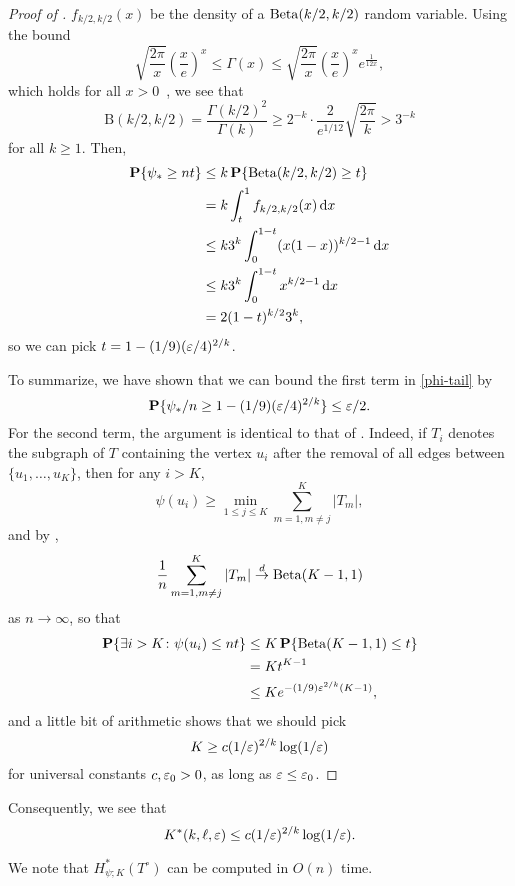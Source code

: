 \begin{proof}[Proof of ]
  $f_{k/2, k/2}(x)$ be the density of a $\operatorname{Beta}(k/2, k/2)$ random
  variable. Using the bound
  \[
    \sqrt{\frac{2 \pi}{x}} \left(\frac{x}{e}\right)^x \le \Gamma(x) \le \sqrt{\frac{2 \pi}{x}} \left(\frac{x}{e} \right)^x e^{\frac{1}{12 x}} ,
  \]
  which holds for all $x > 0$~\cite[Equation 5.6.1]{nist}, we see that
  \[
    \mathrm{B}(k/2, k/2) = \frac{\Gamma(k/2)^2}{\Gamma(k)} \ge 2^{-k} \cdot \frac{2}{e^{1/12}} \sqrt{\frac{2 \pi}{k}} > 3^{-k} 
  \]
  for all $k \ge 1$. Then,
  \begin{align*}
    \operatorname{\mathbf{P}}\{\psi_* \ge nt\} &\le k \operatorname{\mathbf{P}}\{\operatorname{Beta}(k/2, k/2) \ge t\} \\
                                    &= k \int_{t}^1 f_{k/2, k/2}(x) \mathop{}\!\mathrm{d} x \\
                              &\le k 3^k \int_0^{1 - t} (x (1 - x))^{k/2 - 1} \mathop{}\!\mathrm{d} x \\
                              &\le k 3^k \int_0^{1 - t} x^{k/2 - 1} \mathop{}\!\mathrm{d} x \\
                          &= 2 (1 - t)^{k/2} 3^k,
  \end{align*}
  so we can pick $t = 1 - (1/9) (\varepsilon/4)^{2/k}$.

  To summarize, we have shown that we can bound the first term in
  \eqref{phi-tail} by
  \[
    \operatorname{\mathbf{P}}\{\psi_*/n \ge 1 - (1/9) (\varepsilon/4) ^{2/k}\} \le \varepsilon/2 .
  \]
  For the second term, the argument is identical to that of
  \cite[Theorem 3]{finding-adam}. Indeed, if $T_i$ denotes the
  subgraph of $T$ containing the vertex $u_i$ after the removal of all
  edges between $\{u_1, \dots, u_K\}$, then for any $i > K$,
  \[
    \psi(u_i) \ge \min_{1 \le j \le K} \sum_{m = 1, m \neq j}^K |T_m| ,
  \]
  and by ,
  \[
    \frac{1}{n} \sum_{m = 1, m \neq j}^K |T_m| \overset{d}{\to} \operatorname{Beta}(K - 1, 1) 
  \]
  as $n \to \infty$, so that
  \begin{align*}
    \operatorname{\mathbf{P}}\{\exists i > K \colon \psi(u_i) \le nt\} &\le K \operatorname{\mathbf{P}}\{ \operatorname{Beta}(K - 1, 1) \le t\} \\
                                                                     &= K t^{K - 1} \\
                                                                     &\le K e^{- (1/9) \varepsilon^{2/k} (K - 1)} ,
  \end{align*}
  and a little bit of arithmetic shows that we should pick
  \[
    K \ge c (1/\varepsilon)^{2/k} \log (1/\varepsilon)
  \]
  for universal constants $c, \varepsilon_0 > 0$, as long as
  $\varepsilon \le \varepsilon_0$.
\end{proof}

Consequently, we see that
\[
  K^*(k, \ell, \varepsilon) \le c (1/\varepsilon)^{2/k} \log (1/\varepsilon) .
\]

We note that $H^*_{\psi; K}(T^\circ)$ can be computed in $O(n)$ time.
